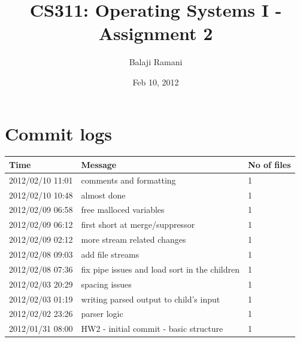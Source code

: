\documentclass[letterpaper,10pt,twocolumn,titlepage]{article}
\begin{document}
\title{CS311: Operating Systems I - Assignment 2}
\author{Balaji Ramani}
\date{Feb 10, 2012}
\maketitle
\section{Commit logs}
\begin{center}
  \begin{tabular}{ | l | l | l | }
    \hline
    Time & Message & No of files \\ \hline
	2012/02/10 11:01 & comments and formatting & 1 \\ \hline
2012/02/10 10:48 & almost done & 1 \\ \hline
2012/02/09 06:58 & free malloced variables & 1 \\ \hline
2012/02/09 06:12 & first short at merge/suppressor & 1 \\ \hline
2012/02/09 02:12 & more stream related changes & 1 \\ \hline
2012/02/08 09:03 & add file streams & 1 \\ \hline
2012/02/08 07:36 & fix pipe issues and load sort in the children & 1 \\ \hline
2012/02/03 20:29 & spacing issues & 1 \\ \hline
2012/02/03 01:19 & writing parsed output to child's input & 1 \\ \hline
2012/02/02 23:26 & parser logic & 1 \\ \hline
2012/01/31 08:00 & HW2 - initial commit - basic structure & 1 \\ \hline
  \end{tabular}
\end{center}
\end{document}
